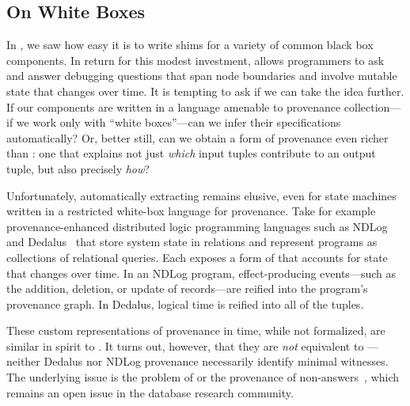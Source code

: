 \begin{techreport}
\section{On White Boxes}
In , we saw how easy it is to write shims for a variety of
common black box components. In return for this modest investment, \fluent{}
allows programmers to ask and answer debugging questions that span node
boundaries and involve mutable state that changes over time. It is tempting to
ask if we can take the idea further. If our components are written in a
language amenable to provenance collection---if we work only with ``white
boxes''---can we infer their \watprovenance{} specifications automatically? Or,
better still, can we obtain a form of provenance even richer than
\watprovenance{}: one that explains not just \emph{which} input tuples
contribute to an output tuple, but also precisely \emph{how}?

Unfortunately, automatically extracting \watprovenance{} remains elusive, even
for state machines written in a restricted white-box language for provenance.
Take for example provenance-enhanced distributed logic programming languages
such as NDLog~\cite{loo2006design} and Dedalus~\cite{alvaro2011dedalus} that
store system state in relations and represent programs as collections of
relational queries. Each exposes a form of \whyprovenance{} that accounts for
state that changes over time. In an NDLog program, effect-producing
events---such as the addition, deletion, or update of records---are reified
into the program's provenance graph. In Dedalus, logical time is reified into
all of the tuples.

These custom representations of provenance in time, while not formalized, are
similar in spirit to \watprovenance{}. It turns out, however, that they are
\emph{not} equivalent to \watprovenance{}---neither Dedalus nor NDLog
provenance necessarily identify minimal witnesses. The underlying issue is the
problem of  or the provenance of
non-answers~\cite{chapman2009whynot,huang2008nonanswers}, which remains an open
issue in the database research community.

\newcommand{\kvset}{\text{set}}
\newcommand{\kvget}{\text{get}}
\newcommand{\freeze}{\text{freeze}}
\newcommand{\trunc}{\text{trunc}}


\end{techreport}
